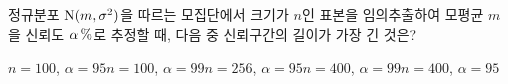 정규분포 $\mathrm{N}(m{,}\mkern3mu\mathopen{}\sigma^2)$을 따르는 모집단에서 크기가 $n$인 표본을 임의추출하여 모평균 $m$을 신뢰도 $\alpha\mkern3mu \%$로 추정할 때, 다음 중 신뢰구간의 길이가 가장 긴 것은?
\begin{choicesii}{$n=100$, $\alpha=95$}{$n=100$, $\alpha=99$}{$n=256$, $\alpha=95$}{$n=400$, $\alpha=99$}{$n=400$, $\alpha=95$}\end{choicesii}
